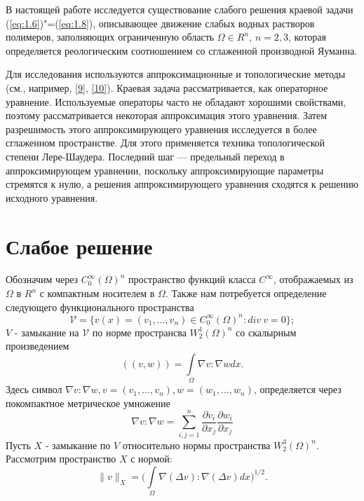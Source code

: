 В настоящей работе исследуется существование слабого решения краевой задачи (\ref{eq:1.6})"=(\ref{eq:1.8}), описывающее движение слабых
водных растворов полимеров, заполняющих ограниченную область $\Omega \in R^n$, $n = 2,3$, которая определяется реологическим
соотношением со сглаженной производной Яуманна.

Для исследования используются аппроксимационные и топологические методы (см., например, \hyperlink{L9}{[9]}, \hyperlink{L10}{[10]}).
Краевая задача рассматривается, как операторное уравнение. Используемые операторы часто не
обладают хорошими свойствами, поэтому рассматривается некоторая аппроксимация этого уравнения. Затем разрешимость
этого аппроксимирующего уравнения исследуется в более сглаженном пространстве. Для этого применяется техника
топологической степени Лере-Шаудера. Последний шаг --- предельный переход  в аппроксимирующем уравнении, поскольку
аппроксимирующие параметры стремятся к нулю, а решения аппроксимирующего уравнения сходятся к решению исходного
уравнения.


\section{Слабое решение}

Обозначим через $C_0^{\infty}(\Omega)^n$ пространство функций класса $C^{\infty}$, отображаемых из $\Omega$ в $R^n$ с
компактным носителем в $\Omega$. Также нам потребуется определение следующего функционального пространства
$$\mathcal{V}=\{v(x)=(v_1,...,v_n)\in C_0^{\infty}(\Omega)^n: div \ v = 0\};$$
$V$ - замыкание на $\mathcal{V}$ по норме пространсва $W^1_2(\Omega)^n$
со скалырным произведением
$$((v,w))=\int\limits_{\Omega}\nabla v : \nabla w dx.$$
Здесь символ $\nabla v : \nabla w, v=(v_1,...,v_n), w=(w_1,...,w_n)$, определяется через покомпактное метрическое умножение
$$\nabla v : \nabla w = \sum_{i,j=1}^n \frac{\partial v_i}{\partial x_j}\frac{\partial w_i}{\partial x_j} $$
Пусть $X$ - замыкание по $V$ относительно нормы пространства $W_2^3(\Omega)^n$. Рассмотрим пространство $X$ с нормой:
$$\parallel v\parallel_{X}=\bigg(\int\limits_{\Omega}\nabla(\Delta v):\nabla(\Delta v)dx\bigg)^{1/2}.$$

